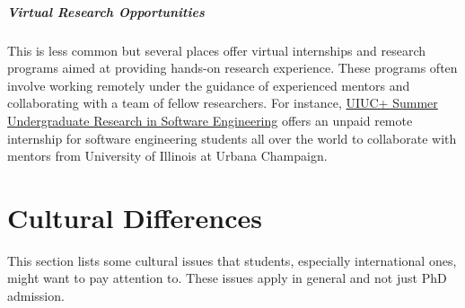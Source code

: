 \documentclass[oneside,11pt,dvipsnames]{book}
\begin{document}
\paragraph{Virtual Research Opportunities} This is less common but several places offer virtual internships and research programs aimed at providing hands-on research experience. These programs often involve working remotely under the guidance of experienced mentors and collaborating with a team of fellow researchers. For instance, \href{https://docs.google.com/forms/d/1btIwt4HwjyKMOUk-EMy3rbkfWzFxv2lNrMm_zkd0pA4/viewform?edit_requested=true}{UIUC+ Summer Undergraduate Research in Software Engineering}  offers an unpaid remote internship for software engineering students all over the world to collaborate with mentors from University of Illinois at Urbana Champaign.



\chapter{Cultural Differences}\label{sec:cultural}

This section lists some cultural issues that students, especially international ones, might want to pay attention to. These issues apply in general and not just PhD admission.

\end{document}
